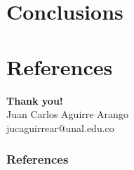 \documentclass[aspectratio=149]{beamer}
\begin{document}
\section{Conclusions}

\section{References}



\begin{frame}{}

\begin{center}
	{\Huge{\textbf{\textcolor[rgb]{0.00,0.00,1.00}{Thank you!}}}}\\
	\vspace{0.1cm}
	 Juan Carlos Aguirre Arango\\ \scriptsize{jucaguirrear@unal.edu.co}
\end{center}    
    
\end{frame}



\begin{frame}[allowframebreaks]
\frametitle{References}
{\tiny 


}
\end{frame}
\end{document}
